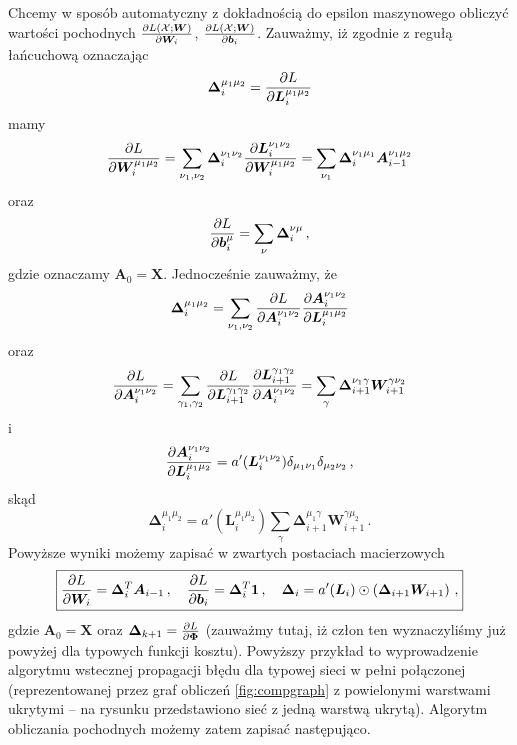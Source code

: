 \documentclass{myclass}
\numberwithin{equation}{subsection}
\begin{document}
Chcemy w sposób automatyczny z dokładnością do epsilon maszynowego obliczyć wartości pochodnych
\(\pdv{L(\mathcal{X}; \bm{W})}{\bm{W}_i}\), \(\pdv{L(\mathcal{X}; \bm{W})}{\bm{b}_i}\). Zauważmy, iż zgodnie z
regułą łańcuchową oznaczając
\[
\bm{\Delta}_i^{\mu_1\mu_2} = \pdv{L}{\bm{L}_i^{\mu_1\mu_2}}
\]
mamy
\[
\pdv{L}{\bm{W}_i^{\mu_1\mu_2}} = \sum_{\nu_1, \nu_2} \bm{\Delta}_i^{\nu_1\nu_2} \pdv{\bm{L}_i^{\nu_1\nu_2}}{\bm{W}_i^{\mu_1\mu_2}} = \sum_{\nu_1} \bm{\Delta}_i^{\nu_1\mu_1} \bm{A}_{i-1}^{\nu_1\mu_2}
\]
oraz
\[
\pdv{L}{\bm{b}_i^\mu} = \sum_\nu \bm{\Delta}_i^{\nu\mu}\,,
\]
gdzie oznaczamy \(\bm{A}_0 = \bm{X}\). Jednocześnie zauważmy, że
\[
\bm{\Delta}_i^{\mu_1\mu_2} = \sum_{\nu_1,\nu_2} \pdv{L}{\bm{A}_i^{\nu_1\nu_2}}\pdv{\bm{A}_i^{\nu_1\nu_2}}{\bm{L}_i^{\mu_1\mu_2}}
\]
oraz
\[
\pdv{L}{\bm{A}_i^{\nu_1\nu_2}} = \sum_{\gamma_1,\gamma_2} \pdv{L}{\bm{L}_{i+1}^{\gamma_1\gamma_2}}\pdv{\bm{L}_{i+1}^{\gamma_1\gamma_2}}{\bm{A}_i^{\nu_1\nu_2}} = \sum_{\gamma} \bm{\Delta}_{i+1}^{\nu_1\gamma}\bm{W}_{i+1}^{\gamma\nu_2}
\]
i
\[
\pdv{\bm{A}_i^{\nu_1\nu_2}}{\bm{L}_i^{\mu_1\mu_2}} = a'(\bm{L}_i^{\nu_1\nu_2}) \delta_{\mu_1\nu_1} \delta_{\mu_2\nu_2}\,,
\]
skąd
\[
\bm{\Delta}_i^{\mu_1\mu_2} = a'(\bm{L}_i^{\mu_1\mu_2}) \sum_\gamma \bm{\Delta}_{i+1}^{\mu_1\gamma}\bm{W}_{i+1}^{\gamma\mu_2}\,.
\]
Powyższe wyniki możemy zapisać w zwartych postaciach macierzowych
\[
\boxed
{
\pdv{L}{\bm{W}_i} = \bm{\Delta}_i^T \bm{A}_{i-1}\,,\quad \pdv{L}{\bm{b}_i} = \bm{\Delta}_i^T \bm{1}\,,\quad \bm{\Delta}_i = a'(\bm{L}_i) \odot \left(\bm{\Delta}_{i+1} \bm{W}_{i+1}\right)\,,
}
\]
gdzie \(\bm{A}_0 = \bm{X}\) oraz \(\bm{\Delta}_{k+1} = \pdv{L}{\bm{\Phi}}\) (zauważmy tutaj, iż
człon ten wyznaczyliśmy już powyżej dla typowych funkcji kosztu). Powyższy przykład to wyprowadzenie
algorytmu wstecznej propagacji błędu dla typowej sieci w pełni połączonej (reprezentowanej przez
graf obliczeń \ref{fig:compgraph} z powielonymi warstwami ukrytymi -- na rysunku przedstawiono sieć
z jedną warstwą ukrytą). Algorytm obliczania pochodnych możemy zatem zapisać następująco.
\end{document}
